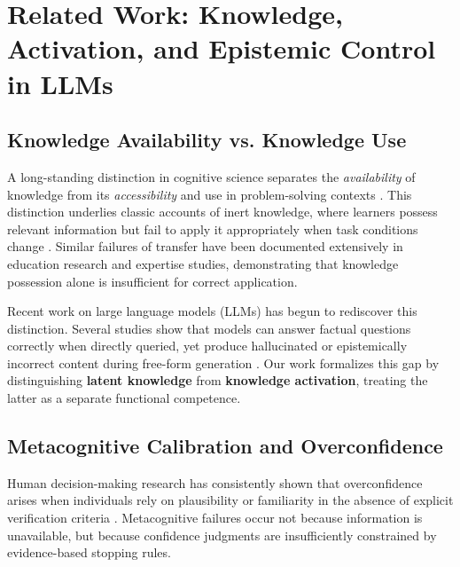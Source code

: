 
\section{Related Work: Knowledge, Activation, and Epistemic Control in LLMs}

\subsection{Knowledge Availability vs. Knowledge Use}

A long-standing distinction in cognitive science separates the \emph{availability} of knowledge from its \emph{accessibility} and use in problem-solving contexts \citep{tulving1966availability}. This distinction underlies classic accounts of inert knowledge, where learners possess relevant information but fail to apply it appropriately when task conditions change \citep{whitehead1929aims}. Similar failures of transfer have been documented extensively in education research and expertise studies, demonstrating that knowledge possession alone is insufficient for correct application.

Recent work on large language models (LLMs) has begun to rediscover this distinction. Several studies show that models can answer factual questions correctly when directly queried, yet produce hallucinated or epistemically incorrect content during free-form generation \citep{ji2023survey, manakul2023selfcheckgpt}. Our work formalizes this gap by distinguishing \textbf{latent knowledge} from \textbf{knowledge activation}, treating the latter as a separate functional competence.


\subsection{Metacognitive Calibration and Overconfidence}

Human decision-making research has consistently shown that overconfidence arises when individuals rely on plausibility or familiarity in the absence of explicit verification criteria \citep{fischhoff1977knowing, rozenblit2002misunderstood}. Metacognitive failures occur not because information is unavailable, but because confidence judgments are insufficiently constrained by evidence-based stopping rules.

